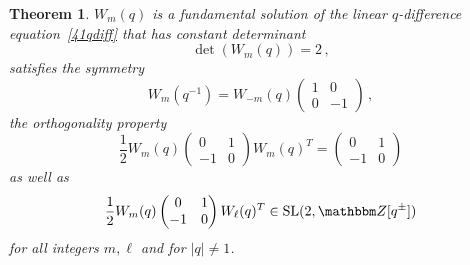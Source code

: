 \documentclass[12pt,reqno]{amsart}
\newtheorem{theorem}{Theorem}
\theoremstyle{definition}
\def\BZ{\mathbbm Z}
\def\SL{\mathrm{SL}}
\begin{document}
\begin{theorem}
  \label{thm.410}
  $W_m(q)$ is a fundamental solution of the linear $q$-difference
  equation~\eqref{41qdiff} that has constant determinant
  \begin{equation}
\label{det41}
\det(W_m(q))=2 \,,
\end{equation}
satisfies the symmetry 
\begin{equation}
  \label{W41inv}
  W_m(q^{-1}) = W_{-m}(q)
  \begin{pmatrix} 1 & 0 \\ 0 & -1 \end{pmatrix} \,,
\end{equation}
the orthogonality property
\begin{equation}
\label{WWT41b}
\frac{1}{2} W_m(q)
\begin{pmatrix} 0 & 1 \\ -1 & 0 \end{pmatrix}
W_{m}(q)^T =
\begin{pmatrix} 0 & 1 \\ -1 & 0 \end{pmatrix} 
\end{equation}
as well as
\begin{equation}
\label{WWT41}
\frac{1}{2} W_m(q)
\begin{pmatrix} 0 & 1 \\ -1 & 0 \end{pmatrix}
W_{\ell}(q)^T \in \SL(2,\BZ[q^\pm]) 
\end{equation}
for all integers $m, \ell$ and for $|q| \neq 1$. 
\end{theorem}
\end{document}
